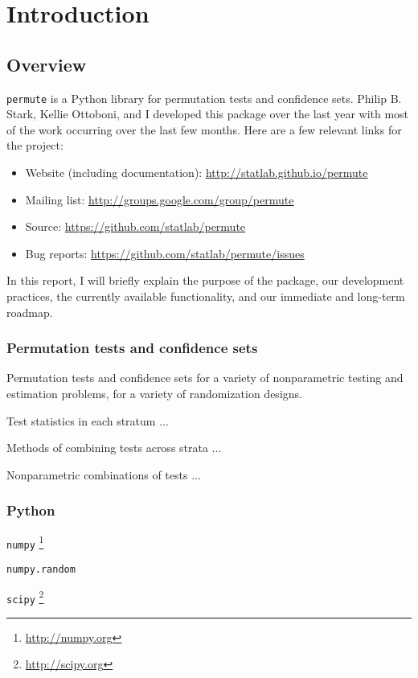 \chapter{Introduction}

\section{Overview}

\texttt{permute} is a Python library for permutation tests and confidence sets.
Philip B. Stark, Kellie Ottoboni, and I developed this package over the
last year with most of the work occurring over the last few months.
Here are a few relevant links for the project:
\begin{itemize}
\item Website (including documentation): \url{http://statlab.github.io/permute}
\item Mailing list: \url{http://groups.google.com/group/permute}
\item Source: \url{https://github.com/statlab/permute}
\item Bug reports: \url{https://github.com/statlab/permute/issues}
\end{itemize}
In this report, I will briefly explain the purpose of the package, our
development practices, the currently available functionality, and
our immediate and long-term roadmap.

\subsection{Permutation tests and confidence sets}

Permutation tests and confidence sets for a variety of nonparametric testing
and estimation problems, for a variety of randomization designs.
   
Test statistics in each stratum ...

Methods of combining tests across strata ...

Nonparametric combinations of tests ...

\subsection{Python}

\cite{millman2011python, Perez2011}

\texttt{numpy} \footnote{\url{http://numpy.org}}

\texttt{numpy.random}

\texttt{scipy} \footnote{\url{http://scipy.org}}

